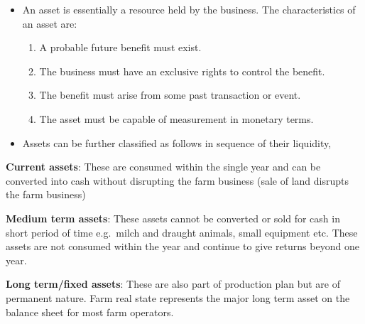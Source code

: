 \documentclass[12pt,ignorenonframetext,aspectratio=169]{beamer}
\providecommand{\tightlist}{%
  \setlength{\itemsep}{0pt}\setlength{\parskip}{0pt}}
\begin{document}
\begin{frame}{}
\protect\hypertarget{section-1}{}
\begin{itemize}
\tightlist
\item
  An asset is essentially a resource held by the business. The
  characteristics of an asset are:

  \begin{enumerate}
  \tightlist
  \item
    A probable future benefit must exist.
  \item
    The business must have an exclusive rights to control the benefit.
  \item
    The benefit must arise from some past transaction or event.
  \item
    The asset must be capable of measurement in monetary terms.
  \end{enumerate}
\end{itemize}
\end{frame}

\begin{frame}{}
\protect\hypertarget{section-2}{}
\begin{itemize}
\tightlist
\item
  Assets can be further classified as follows in sequence of their
  liquidity,
\end{itemize}

\textbf{Current assets}: These are consumed within the single year and
can be converted into cash without disrupting the farm business (sale of
land disrupts the farm business)

\textbf{Medium term assets}: These assets cannot be converted or sold
for cash in short period of time e.g.~milch and draught animals, small
equipment etc. These assets are not consumed within the year and
continue to give returns beyond one year.

\textbf{Long term/fixed assets}: These are also part of production plan
but are of permanent nature. Farm real state represents the major long
term asset on the balance sheet for most farm operators.
\end{frame}
\end{document}
